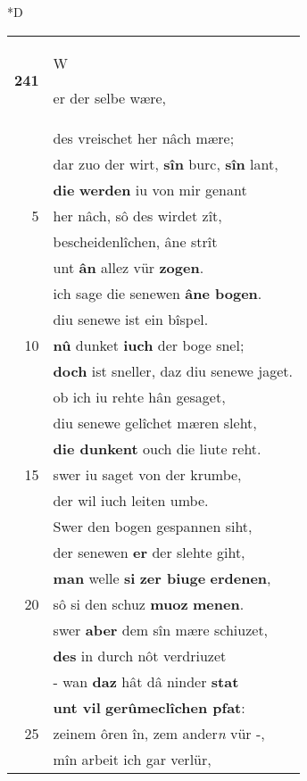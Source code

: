 \documentclass[8pt,a4paper,notitlepage]{article}
\begin{document}
\begin{table}[ht]
\begin{minipage}[t]{0.5\linewidth}
\small
\begin{center}*D
\end{center}
\begin{tabular}{rl}
\textbf{241} & \begin{large}W\end{large}er der selbe wære,\\ 
 & des vreischet her nâch mære;\\ 
 & dar zuo der wirt, \textbf{sîn} burc, \textbf{sîn} lant,\\ 
 & \textbf{die} \textbf{werden} iu von mir genant\\ 
5 & her nâch, sô des wirdet zît,\\ 
 & bescheidenlîchen, âne strît\\ 
 & unt \textbf{ân} allez vür \textbf{zogen}.\\ 
 & ich sage die senewen \textbf{âne bogen}.\\ 
 & diu senewe ist ein bîspel.\\ 
10 & \textbf{nû} dunket \textbf{iuch} der boge snel;\\ 
 & \textbf{doch} ist sneller, daz diu senewe jaget.\\ 
 & ob ich iu rehte hân gesaget,\\ 
 & diu senewe gelîchet mæren sleht,\\ 
 & \textbf{die dunkent} ouch die liute reht.\\ 
15 & swer iu saget von der krumbe,\\ 
 & der wil iuch leiten umbe.\\ 
 & Swer den bogen gespannen siht,\\ 
 & der senewen \textbf{er} der slehte giht,\\ 
 & \textbf{man} welle \textbf{si} \textbf{zer biuge} \textbf{erdenen},\\ 
20 & sô si den schuz \textbf{muoz} \textbf{menen}.\\ 
 & swer \textbf{aber} dem sîn mære schiuzet,\\ 
 & \textbf{des} in durch nôt verdriuzet\\ 
 & - wan \textbf{daz} hât dâ ninder \textbf{stat}\\ 
 & \textbf{unt vil} \textbf{gerûmeclîchen pfat}:\\ 
25 & zeinem ôren în, zem ander\textit{n} vür -,\\ 
 & mîn arbeit ich gar verlür,\\ 

\end{tabular}
\end{minipage}
\end{table}
\end{document}
